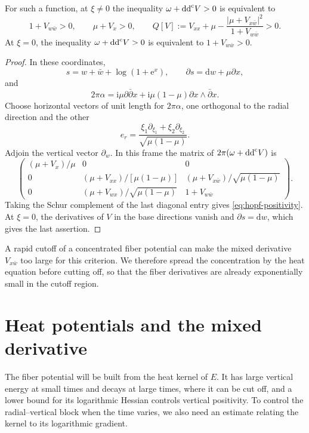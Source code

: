 \begin{lemma}\label{lem:hopf-positivity}
For such a function, at $\xi\ne0$ the inequality $\omega+\mathrm{dd}^{\mathrm{c}} V>0$ is equivalent to
\begin{equation}\label{eq:hopf-positivity}
 1+V_{w\bar w}>0,\qquad \mu+V_x>0,\qquad
 Q[V]:=V_{xx}+\mu-
       \frac{|\mu+V_{x\bar w}|^2}{1+V_{w\bar w}}>0.
\end{equation}
At $\xi=0$, the inequality $\omega+\mathrm{dd}^{\mathrm{c}} V>0$ is equivalent to $1+V_{w\bar w}>0$.
\end{lemma}
\begin{proof}
In these coordinates,
\[
 s=w+\bar w+\log(1+\mathrm{e}^x),\qquad
 \partial s=\mathrm{d}w+\mu\partial x,
\]
and
\[
 2\pi\alpha
 =\mathrm i\mu\partial\bar\partial x
  +\mathrm i\mu(1-\mu)\partial x\wedge\bar\partial x.
\]
Choose horizontal vectors of unit length for $2\pi\alpha$, one orthogonal to the radial direction and the other
\[
 e_r=\frac{\xi_1\partial_{\xi_1}+\xi_2\partial_{\xi_2}}
                {\sqrt{\mu(1-\mu)}}.
\]
Adjoin the vertical vector $\partial_w$. In this frame the matrix of $2\pi(\omega+\mathrm{dd}^{\mathrm{c}} V)$ is
\[
 \begin{pmatrix}
 (\mu+V_x)/\mu&0&0\\
 0&(\mu+V_{xx})/[\mu(1-\mu)]&
       (\mu+V_{x\bar w})/\sqrt{\mu(1-\mu)}\\
 0&(\mu+V_{wx})/\sqrt{\mu(1-\mu)}&1+V_{w\bar w}
 \end{pmatrix}.
\]
Taking the Schur complement of the last diagonal entry gives \eqref{eq:hopf-positivity}. At $\xi=0$, the derivatives of $V$ in the base directions vanish and $\partial s=\mathrm{d}w$, which gives the last assertion.
\end{proof}

A rapid cutoff of a concentrated fiber potential can make the mixed derivative $V_{x\bar w}$ too large for this criterion. We therefore spread the concentration by the heat equation before cutting off, so that the fiber derivatives are already exponentially small in the cutoff region.

\section{Heat potentials and the mixed derivative}

The fiber potential will be built from the heat kernel of $E$. It has large vertical energy at small times and decays at large times, where it can be cut off, and a lower bound for its logarithmic Hessian controls vertical positivity. To control the radial--vertical block when the time varies, we also need an estimate relating the kernel to its logarithmic gradient.

